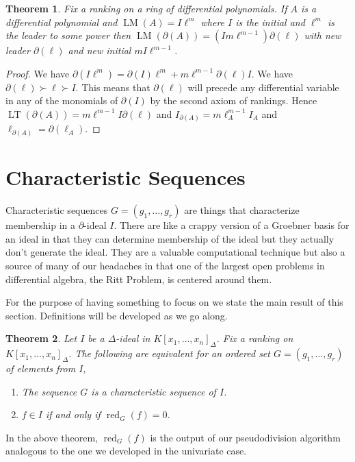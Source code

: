 \documentclass[12pt]{book}
\numberwithin{equation}{section}
\newtheorem{theorem}{Theorem}[subsection]
\theoremstyle{definition}
\theoremstyle{remark}
\newcommand{\LM}{\operatorname{LM}}
\newcommand{\LT}{\operatorname{LT}}
\newcommand{\red}{\operatorname{red}}
\begin{document}
\begin{theorem}
	Fix a ranking on a ring of differential polynomials.
	If $A$ is a differential polynomial and $\LM(A) = I \ell^m$ where $I$ is the initial and $\ell^m$ is the leader to some power then $\LM(\partial(A)) = (I m \ell^{m-1}) \partial(\ell)$ with new leader $\partial(\ell)$ and new initial $mI\ell^{m-1}$.
\end{theorem}
\begin{proof}
	We have $\partial(I \ell^m) = \partial(I)\ell^m + m\ell^{m-1}\partial(\ell)I$. 
	We have $\partial(\ell) \succ \ell \succ I$. 
	This means that $\partial(\ell)$ will precede any differential variable in any of the monomials of $\partial(I)$ by the second axiom of rankings.
	Hence $\LT(\partial(A) ) = m\ell^{m-1}I \partial(\ell)$ and $I_{\partial(A)} = m \ell_A^{m-1} I_A$ and $\ell_{\partial(A)} = \partial(\ell_A)$.
\end{proof}




\section{Characteristic Sequences}

Characteristic sequences $G=(g_1,\ldots,g_r)$ are things that characterize membership in a $\partial$-ideal $I$.
There are like a crappy version of a Groebner basis for an ideal in that they can determine membership of the ideal but they actually don't generate the ideal. 
They are a valuable computational technique but also a source of many of our headaches in that one of the largest open problems in differential algebra, the Ritt Problem, is centered around them.

For the purpose of having something to focus on we state the main result of this section. 
Definitions will be developed as we go along. 
\begin{theorem}
	Let $I$ be a $\Delta$-ideal in $K[x_1,\ldots,x_n]_{\Delta}$. 
	Fix a ranking on $K[x_1,\ldots,x_n]_{\Delta}$.
	The following are equivalent for an ordered set $G=(g_1,\ldots,g_r)$ of elements from $I$,
	\begin{enumerate}[topsep=0pt]
		\item The sequence $G$ is a characteristic sequence of $I$.
		\item $f \in I$ if and only if $\red_G(f)=0$. 
	\end{enumerate}
\end{theorem}
In the above theorem, $\red_G(f)$ is the output of our pseudodivision algorithm analogous to the one we developed in the univariate case.
\end{document}
